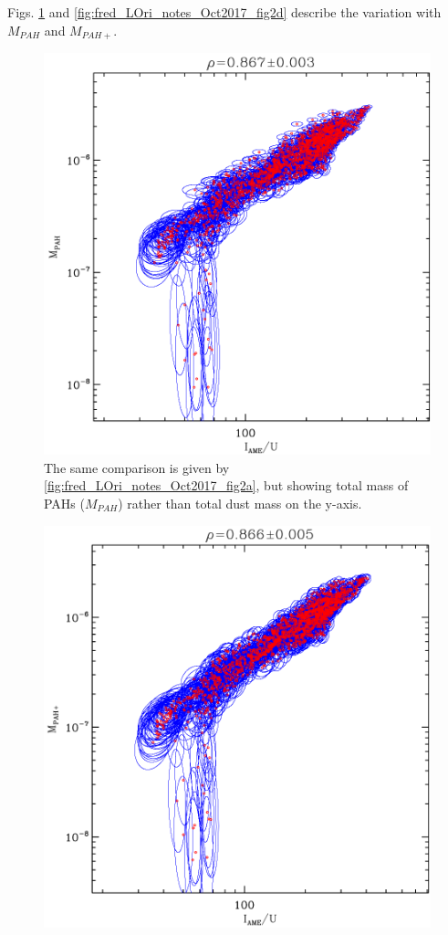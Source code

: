 {          Figs. \ref{fig:fred_LOri_notes_Oct2017_fig2b} and \ref{fig:fred_LOri_notes_Oct2017_fig2d} describe the variation with $M_{PAH}$ and $M_{PAH+}$.
              \begin{figure}
                \includegraphics[width=\textwidth/2]{../Plots/ch_lori/fred_LOri_notes_Oct2017_fig2b.pdf}
                \centering
                \caption{The same comparison is given by \ref{fig:fred_LOri_notes_Oct2017_fig2a}, but showing total mass of PAHs ($M_{PAH}$) rather than total dust mass on the y-axis. }
                \label{fig:fred_LOri_notes_Oct2017_fig2b}
              \end{figure}
              \begin{figure}
                \includegraphics[width=\textwidth/2]{../Plots/ch_lori/fred_LOri_notes_Oct2017_fig2d.pdf}

\end{figure}}
